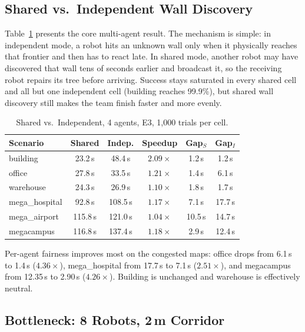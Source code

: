 \documentclass[letterpaper, 10pt, conference]{IEEEtran}
\begin{document}
\subsection{Shared vs.\ Independent Wall Discovery}
\label{sec:sharing}

Table~\ref{tab:sharing} presents the core multi-agent result. The mechanism is simple: in independent mode, a robot hits an unknown wall only when it physically reaches that frontier and then has to react late. In shared mode, another robot may have discovered that wall tens of seconds earlier and broadcast it, so the receiving robot repairs its tree before arriving. Success stays saturated in every shared cell and all but one independent cell (building reaches 99.9\%), but shared wall discovery still makes the team finish faster and more evenly.

\begin{table}[t]
\centering
\caption{Shared vs.\ Independent, 4 agents, E3, 1{,}000 trials per cell.}
\label{tab:sharing}
\begin{tabular}{l cc c cc}
\toprule
Scenario & Shared & Indep. & Speedup & Gap$_S$ & Gap$_I$ \\
\midrule
building       & 23.2\,s &  48.4\,s & $2.09\times$ & 1.2\,s & 1.2\,s \\
office         & 27.8\,s &  33.5\,s & $1.21\times$ & 1.4\,s & 6.1\,s \\
warehouse      & 24.3\,s &  26.9\,s & $1.10\times$ & 1.8\,s & 1.7\,s \\
mega\_hospital &  92.8\,s & 108.5\,s & $1.17\times$ & 7.1\,s & 17.7\,s \\
mega\_airport  & 115.8\,s & 121.0\,s & $1.04\times$ & 10.5\,s & 14.7\,s \\
megacampus     & 116.8\,s & 137.4\,s & $1.18\times$ & 2.9\,s & 12.4\,s \\
\bottomrule
\end{tabular}

\vspace{1mm}
\begin{minipage}{\columnwidth}
\footnotesize
Per-agent fairness improves most on the congested maps: office drops from 6.1\,s to 1.4\,s ($4.36\times$), mega\_hospital from 17.7\,s to 7.1\,s ($2.51\times$), and megacampus from 12.35\,s to 2.90\,s ($4.26\times$). Building is unchanged and warehouse is effectively neutral.
\end{minipage}
\end{table}

\subsection{Bottleneck: 8 Robots, 2\,m Corridor}
\end{document}
